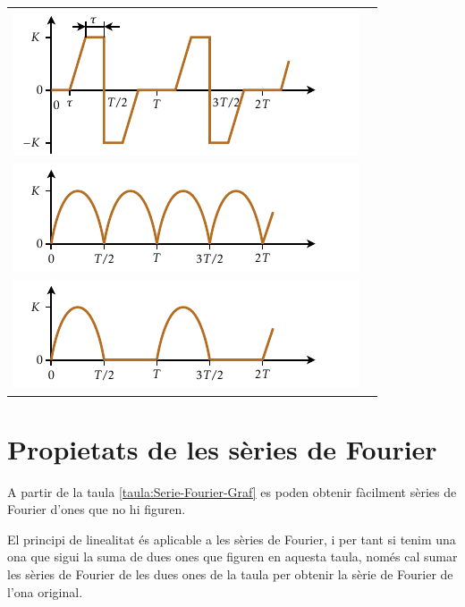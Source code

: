 \begin{longtable}{cc}
   \includegraphics{Imatges/Cap-Fourier-Funcio-12.pdf} & \raisebox{1.2cm}{$\displaystyle\frac{{2K}}{\piup }\sum\limits_{n = 1}^\infty  {\left( {1 + \frac{{\big(1 + ( - 1)^n \big)\sin (n\omega \tau )}}{{n(\piup  - 2\omega \tau )}}} \right)\frac{{( - 1)^{n+1} \sin (n\omega t)}}{n}}$}\\[2.4ex]
   \includegraphics{Imatges/Cap-Fourier-Funcio-13.pdf} & \raisebox{0.8cm}{$\displaystyle\frac{{2K}}{\piup } - \frac{{4K}}{\piup }\sum\limits_{n = 1}^\infty  {\frac{{\cos(2n\omega t)}}{{4n^2  - 1}}}$}\\[2.4ex]
   \includegraphics{Imatges/Cap-Fourier-Funcio-14.pdf} & \raisebox{0.8cm}{$\displaystyle\frac{K}{\piup } + \frac{K}{2}\sin (\omega t) - \frac{{2K}}{\piup }\sum\limits_{n = 1}^\infty  {\frac{{\cos (2n\omega t)}}{{4n^2  - 1}}}$}\\[2.4ex]
    \bottomrule[1pt]
\end{longtable}


\section{Propietats de les s\`{e}ries de Fourier}

A partir de la taula \vref{taula:Serie-Fourier-Graf} es poden obtenir f\`{a}cilment s\`{e}ries de Fourier d'ones que no hi figuren.

El principi de linealitat \'{e}s aplicable a les s\`{e}ries de Fourier, i per tant si tenim una ona que sigui la suma de dues ones que figuren en aquesta taula, nom\'{e}s  cal sumar les s\`{e}ries de Fourier de les dues ones de la taula per obtenir la s\`{e}rie de Fourier de l'ona original.

